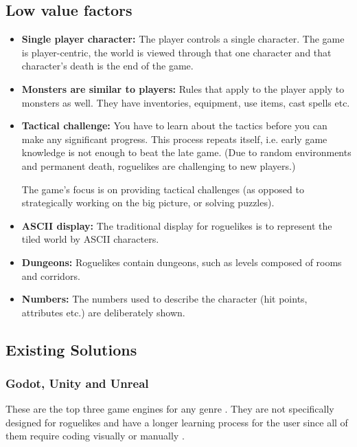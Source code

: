 \documentclass{article}
\begin{document}
\subsection*{Low value factors} 
\begin{itemize}
    \item \textbf{Single player character:}
    The player controls a single character. The game is player-centric, 
    the world is viewed through that one character and that character's 
    death is the end of the game. 
    
    \item \textbf{Monsters are similar to players:}
    Rules that apply to the player apply to monsters as well. They have 
    inventories, equipment, use items, cast spells etc. 
    
    \item \textbf{Tactical challenge:}
    You have to learn about the tactics before you can make any 
    significant progress. This process repeats itself, i.e. early game 
    knowledge is not enough to beat the late game. (Due to random 
    environments and permanent death, roguelikes are challenging to new 
    players.) 
    
    The game's focus is on providing tactical challenges (as opposed to 
    strategically working on the big picture, or solving puzzles). 
    
    \item \textbf{ASCII display:}
    The traditional display for roguelikes is to represent the tiled world 
    by ASCII characters. 
    
    \item \textbf{Dungeons:}
    Roguelikes contain dungeons, such as levels composed of rooms and 
    corridors. 
    
    \item \textbf{Numbers:}
    The numbers used to describe the character (hit points, attributes 
    etc.) are deliberately shown. 
\end{itemize}

\subsection{Existing Solutions}
\subsubsection{Godot, Unity and Unreal}
These are the top three game engines for any genre . They are not specifically designed for roguelikes and have a longer learning process for the user since all of them require coding visually or manually \cite{godot}\cite{unity}\cite{unreal}.\\
\end{document}
